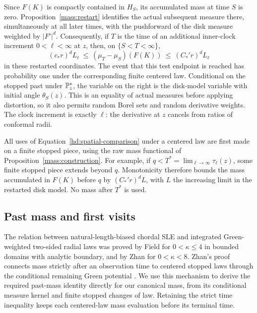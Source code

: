 Since \(F(K)\) is compactly contained in \(H_S\), its accumulated
mass at time \(S\) is zero. Proposition~\ref{mass:restart} identifies
the actual subsequent measure there, simultaneously at all later
times, with the pushforward of the disk measure weighted by
\(|F'|^d\). Consequently, if \(T\) is the time of an additional
inner-clock increment \(0<\ell<\infty\) at \(z\), then, on
\(\{S<T<\infty\}\),
\begin{equation}
 (c_*r)^d L_\ell
 \ \le\ (\mu_T-\mu_S)(F(K))
 \ \le\ (C_*'r)^d L_\ell
 \label{hd:spatial-comparison}
\end{equation}
in these restarted coordinates. The event that this test endpoint
is reached has probability one under the corresponding finite
centered law. Conditional on the stopped past
under \(\mathbb P_z^*\), the variable on the right is the disk-model
variable with initial angle \(\theta_S(z)\).
This is an equality of actual measures before applying distortion,
so it also permits random Borel sets and random derivative weights.
The clock increment is exactly \(\ell\): the derivative at \(z\)
cancels from ratios of conformal radii.

All uses of Equation~\eqref{hd:spatial-comparison} under a centered
law are first made on a finite stopped piece, using the raw mass
functional of Proposition~\ref{mass:construction}.
For example, if \(q<T^*=\lim_{\ell\to\infty}\tau_\ell(z)\), some
finite stopped piece extends beyond \(q\). Monotonicity therefore
bounds the mass accumulated in \(F(K)\) before \(q\) by
\((C_*'r)^dL\), with \(L\) the increasing limit in the restarted
disk model. No mass after \(T^*\) is used.

\subsection{Past mass and first visits}
\label{hd:palm-section}

The relation between natural-length-biased chordal SLE and integrated
Green-weighted two-sided radial laws was proved by
Field \cite[Theorem~1]{Field2016} for $0<\kappa\le4$ in bounded
domains with analytic boundary, and by
Zhan \cite[Theorem~4.1]{Zhan2019Decomposition} for $0<\kappa<8$.
Zhan's proof connects mass strictly after an observation time to
centered stopped laws through the conditional remaining Green potential
\cite[Proposition~2.2, equation~(2.1), and equations~(4.3)--(4.5)]{Zhan2019Decomposition}.
We use this mechanism to derive the required past-mass identity
directly for our canonical mass, from its conditional measure kernel
and finite stopped changes of law. Retaining the strict time inequality
keeps each centered-law mass evaluation before its terminal time.

